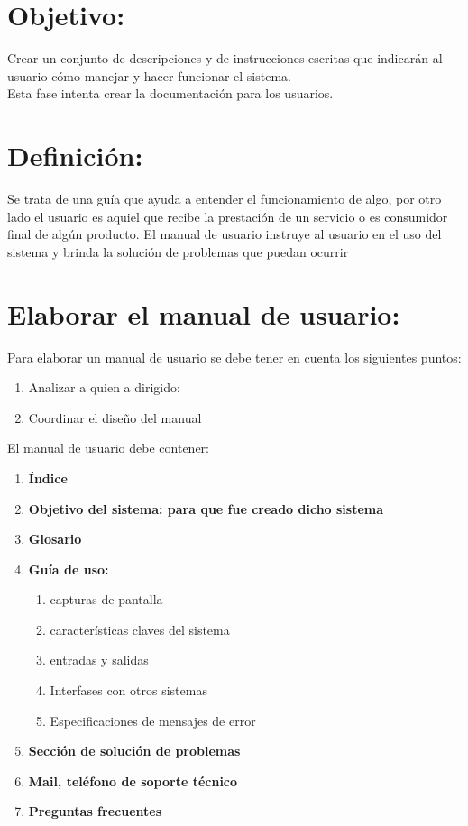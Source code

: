 \documentclass[12pt]{book}
\begin{document}
\section{Objetivo:}
Crear un conjunto de descripciones y de instrucciones escritas que indicarán al usuario cómo
manejar y hacer funcionar el sistema.\\
Esta fase intenta crear la documentación para los usuarios.
\section{Definición:}
Se trata de una guía que ayuda a entender el funcionamiento de algo, por otro lado el usuario es aquiel que recibe la prestación de un servicio o es consumidor final de algún producto. El manual de usuario instruye al usuario en el uso del sistema y brinda la solución de problemas
que puedan ocurrir
\section{Elaborar el manual de usuario:}
Para elaborar un manual de usuario se debe tener en cuenta los siguientes puntos:
\begin{enumerate}
	\item Analizar a quien a dirigido:
	\item Coordinar el diseño del manual 	
\end{enumerate}

El manual de usuario debe contener:

{\setlength{\parindent}{64pt}
\begin{enumerate}
	\item \textbf{Índice}
	\item \textbf{Objetivo del sistema: para que fue creado dicho sistema}
	\item \textbf{Glosario}
	\item \textbf{Guía de uso:}

		\begin{enumerate}
			\item capturas de pantalla
			\item características claves del sistema
			\item entradas y salidas
			\item Interfases con otros sistemas			
			\item Especificaciones de mensajes de error 			
			
		\end{enumerate}

		
	\item \textbf{Sección de solución de problemas}
	\item \textbf{Mail, teléfono de soporte técnico}	
	\item \textbf{Preguntas frecuentes}
																															
\end{enumerate}

}%
\end{document}
